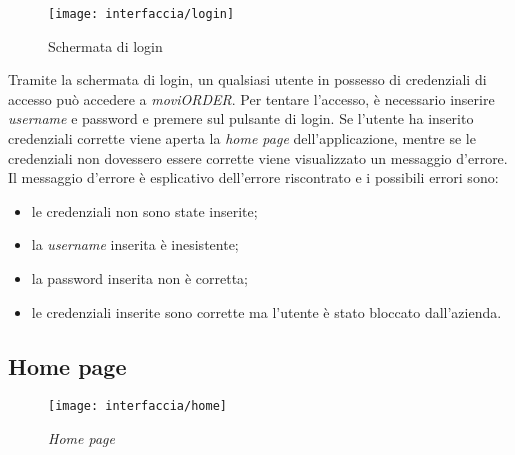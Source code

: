 \begin{figure}[!h] 
    \centering 
    \texttt{[image: interfaccia/login]} 
    \caption{Schermata di login}
\end{figure}

Tramite la schermata di login, un qualsiasi utente in possesso di credenziali di accesso può accedere a \textit{moviORDER}. Per tentare l'accesso, è necessario inserire \textit{username} e password e premere sul pulsante di login. Se l'utente ha inserito credenziali corrette viene aperta la \textit{home page} dell'applicazione, mentre se le credenziali non dovessero essere corrette viene visualizzato un messaggio d'errore. Il messaggio d'errore è esplicativo dell'errore riscontrato e i possibili errori sono:
\begin{itemize}
	\item le credenziali non sono state inserite;
	\item la \textit{username} inserita è inesistente;
	\item la password inserita non è corretta;
	\item le credenziali inserite sono corrette ma l'utente è stato bloccato dall'azienda.
\end{itemize}

\subsection{Home page}

\begin{figure}[!h] 
    \centering 
    \texttt{[image: interfaccia/home]} 
    \caption{\textit{Home page}}
\end{figure}

